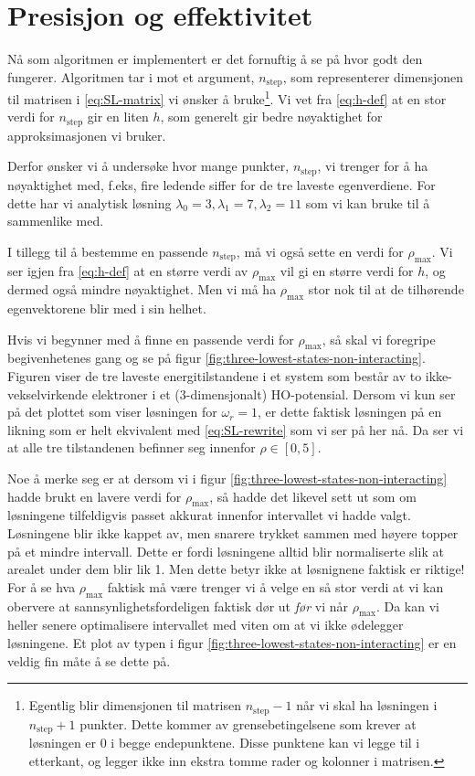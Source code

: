\documentclass[11pt]{article}
\begin{document}
\section{Presisjon og effektivitet}
Nå som algoritmen er implementert er det fornuftig å se på hvor godt
den fungerer. Algoritmen tar i mot et argument, $n_{\text{step}}$, som
representerer dimensjonen til matrisen i \eqref{eq:SL-matrix} vi
ønsker å bruke\footnote{Egentlig blir dimensjonen til matrisen
  $n_\text{step}-1$ når vi skal ha løsningen i $n_\text{step}+1$
  punkter. Dette kommer av grensebetingelsene som krever at løsningen
  er 0 i begge endepunktene. Disse punktene kan vi legge til i
  etterkant, og legger ikke inn ekstra tomme rader og kolonner i
  matrisen.}. Vi vet fra \eqref{eq:h-def} at en stor verdi for
$n_\text{step}$ gir en liten $h$, som generelt gir bedre nøyaktighet
for approksimasjonen vi bruker.  

Derfor ønsker vi å undersøke hvor mange punkter, $n_\text{step}$, vi
trenger for å ha nøyaktighet med, f.eks, fire ledende siffer for de
tre laveste egenverdiene. For dette har vi analytisk løsning $\lambda_0=3,\lambda_1=7,\lambda_2=11$ som vi kan bruke til å
sammenlike med. 

I tillegg til å bestemme en passende
$n_\text{step}$, må vi også sette en verdi for $\rho_\text{max}$. Vi
ser igjen fra \eqref{eq:h-def} at en større verdi av $\rho_\text{max}$
vil gi en større verdi for $h$, og dermed også mindre nøyaktighet. Men
vi må ha $\rho_\text{max}$ stor nok til at de tilhørende egenvektorene
blir med i sin helhet. 

Hvis vi begynner med å finne en passende verdi for $\rho_\text{max}$,
så skal vi foregripe begivenhetenes gang og se på figur  %
\ref{fig:three-lowest-states-non-interacting}. Figuren viser de tre
laveste energitilstandene i et system som består av to
ikke-vekselvirkende elektroner i et (3-dimensjonalt)
HO-potensial. Dersom vi kun ser på det plottet som viser løsningen for
$\omega_r=1$, er dette faktisk løsningen på en likning som er helt
ekvivalent med \eqref{eq:SL-rewrite} som vi ser på her nå. Da ser vi
at alle tre tilstandenen befinner seg innenfor $\rho\in[0,5]$. 

Noe å merke seg er at dersom vi i figur
\ref{fig:three-lowest-states-non-interacting} hadde brukt en lavere
verdi for $\rho_\text{max}$, så hadde det likevel sett ut som om
løsningene tilfeldigvis passet akkurat innenfor intervallet vi hadde
valgt. Løsningene blir ikke kappet av, men snarere trykket sammen med
høyere topper på et mindre intervall. Dette er fordi løsningene alltid
blir normaliserte slik at arealet under dem blir lik 1. Men dette
betyr ikke at løsnignene faktisk er riktige! For å se hva
$\rho_\text{max}$ faktisk må være trenger vi å velge en så stor verdi
at vi kan obervere at sannsynlighetsfordeligen faktisk dør ut
\emph{før} vi når $\rho_\text{max}$. Da kan vi heller senere
optimalisere intervallet med viten om at vi ikke ødelegger
løsningene. Et plot av typen i figur
\ref{fig:three-lowest-states-non-interacting} er en veldig fin måte å
se dette på. 
\end{document}
